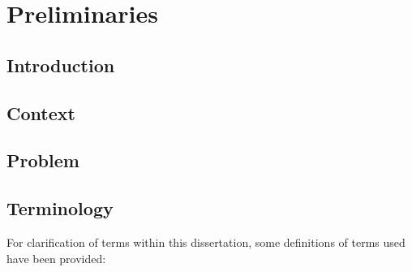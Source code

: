 \chapter{Preliminaries}
\label{intro}

\section{Introduction}


\section{Context}
\section{Problem}

\section{Terminology}
For clarification of terms within this dissertation, some definitions of terms used have been provided: 
\label{introducing_technology}

